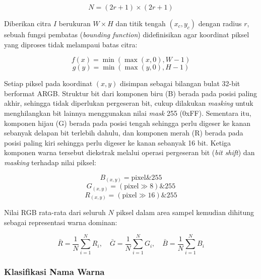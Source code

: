 \begin{equation}
N = (2r+1) \times (2r+1)
\end{equation}

Diberikan citra $I$ berukuran $W \times H$ dan titik tengah $(x_c, y_c)$ dengan radius $r$, sebuah fungsi pembatas (\textit{bounding function}) didefinisikan agar koordinat piksel yang diproses tidak melampaui batas citra:

\begin{equation}
f(x) = \min(\max(x, 0), W-1)
\end{equation}
\begin{equation}
g(y) = \min(\max(y, 0), H-1)
\end{equation}

Setiap piksel pada koordinat $(x,y)$ disimpan sebagai bilangan bulat 32-bit berformat ARGB. Struktur bit dari komponen biru (B) berada pada posisi paling akhir, sehingga tidak diperlukan pergeseran bit, cukup dilakukan \textit{masking} untuk menghilangkan bit lainnya menggunakan nilai \textit{mask} 255 (0xFF). Sementara itu, komponen hijau (G) berada pada posisi tengah sehingga perlu digeser ke kanan sebanyak delapan bit terlebih dahulu, dan komponen merah (R) berada pada posisi paling kiri sehingga perlu digeser ke kanan sebanyak 16 bit. Ketiga komponen warna tersebut diekstrak melalui operasi pergeseran bit (\textit{bit shift}) dan \textit{masking} terhadap nilai piksel:

\begin{equation}
B_{(x,y)} = \text{pixel} \mathbin{\&} 255
\end{equation}
\begin{equation}
G_{(x,y)} = (\text{pixel} \gg 8) \mathbin{\&} 255
\end{equation}
\begin{equation}
R_{(x,y)} = (\text{pixel} \gg 16) \mathbin{\&} 255
\end{equation}

Nilai RGB rata-rata dari seluruh $N$ piksel dalam area sampel kemudian dihitung sebagai representasi warna dominan:

\begin{equation}
\bar{R} = \frac{1}{N}\sum_{i=1}^{N} R_i, \quad
\bar{G} = \frac{1}{N}\sum_{i=1}^{N} G_i, \quad
\bar{B} = \frac{1}{N}\sum_{i=1}^{N} B_i
\end{equation}

\subsubsection{Klasifikasi Nama Warna}

